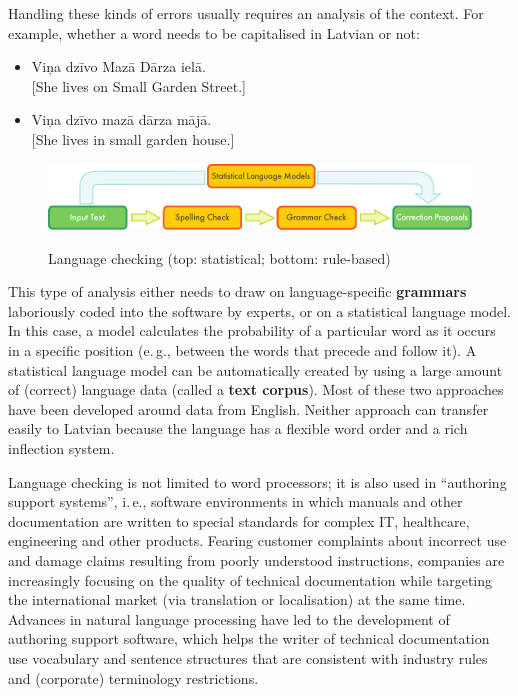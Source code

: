 \begin{multicols}{2}
Handling these kinds of errors usually requires an analysis of the context.
For example, whether a word needs to be capitalised in Latvian or not:

\begin{itemize}
\item Viņa dzīvo Mazā Dārza ielā.\\
  {[}She lives on Small Garden Street.{]}
\item Viņa dzīvo mazā dārza mājā.\\
  {[}She lives in small garden house.{]}
\end{itemize}

\begin{figure}[thb]
  \center
  \includegraphics[width=\textwidth]{../_media/english/language_checking}
  \caption{Language checking (top: statistical; bottom: rule-based)}
   \label{fig:langcheckingaarch_en}
\end{figure}

This type of analysis either needs to draw on language-specific \textbf{grammars} laboriously coded into the software by experts, or on a statistical language model.
In this case, a model calculates the probability of a particular word as it occurs in a specific position (e.\,g., between the words that precede and follow it).
A statistical language model can be automatically created by using a large amount of (correct) language data (called a \textbf{text corpus}).
Most of these two approaches have been developed around data from English.
Neither approach can transfer easily to Latvian because the language has a flexible word order and a rich inflection system. 


Language checking is not limited to word processors; it is also used in ``authoring support systems'', i.\,e., software environments in which manuals and other documentation are written to special standards for complex IT, healthcare, engineering and other products.
Fearing customer complaints about incorrect use and damage claims resulting from poorly understood instructions, companies are increasingly focusing on the quality of technical documentation while targeting the international market (via translation or localisation) at the same time.
Advances in natural language processing have led to the development of authoring support software, which helps the writer of technical documentation use vocabulary and sentence structures that are consistent with industry rules and (corporate) terminology restrictions.


\end{multicols}

